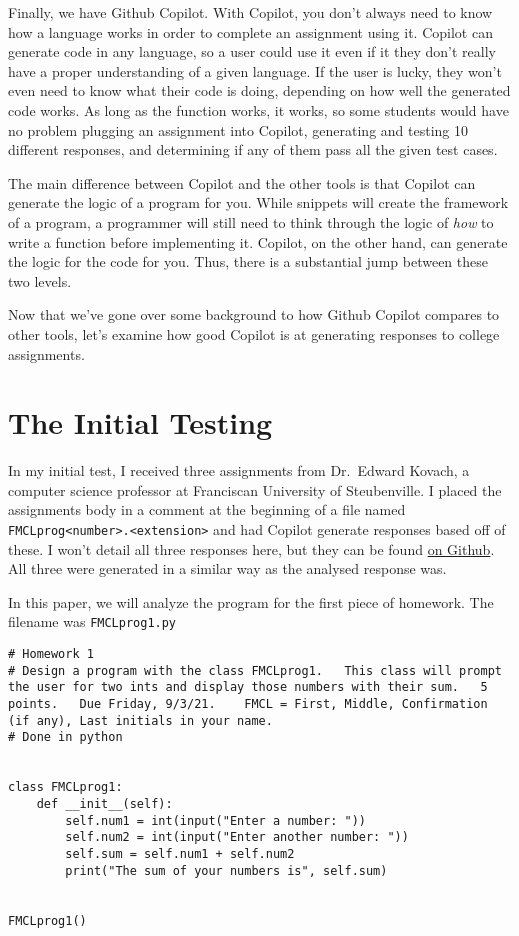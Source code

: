 \documentclass[12pt]{article}
\begin{document}
Finally, we have Github Copilot. With Copilot, you don't always need to
know how a language works in order to complete an assignment using it.
Copilot can generate code in any language, so a user could use it even
if it they don't really have a proper understanding of a given language.
If the user is lucky, they won't even need to know what their code is
doing, depending on how well the generated code works. As long as the
function works, it works, so some students would have no problem
plugging an assignment into Copilot, generating and testing 10 different
responses, and determining if any of them pass all the given test cases.

The main difference between Copilot and the other tools is that Copilot
can generate the logic of a program for you. While snippets will create
the framework of a program, a programmer will still need to think
through the logic of \emph{how} to write a function before implementing
it. Copilot, on the other hand, can generate the logic for the code for
you. Thus, there is a substantial jump between these two levels.

Now that we've gone over some background to how Github Copilot compares
to other tools, let's examine how good Copilot is at generating
responses to college assignments.

\hypertarget{the-initial-testing}{%
\section{The Initial Testing}\label{the-initial-testing}}

In my initial test, I received three assignments from Dr.~Edward Kovach,
a computer science professor at Franciscan University of Steubenville. I
placed the assignments body in a comment at the beginning of a file
named
\texttt{FMCLprog\textless{}number\textgreater{}.\textless{}extension\textgreater{}}
and had Copilot generate responses based off of these. I won't detail
all three responses here, but they can be found
\href{https://github.com/2br-2b/Github-Copilot-Project/tree/master/Scholarly\%20Testing/}{on
Github}. All three were generated in a similar way as the analysed
response was.

In this paper, we will analyze the program for the first piece of
homework. The filename was \texttt{FMCLprog1.py}

\begin{lstlisting}
# Homework 1 
# Design a program with the class FMCLprog1.   This class will prompt the user for two ints and display those numbers with their sum.   5 points.   Due Friday, 9/3/21.    FMCL = First, Middle, Confirmation (if any), Last initials in your name. 
# Done in python 


class FMCLprog1:
    def __init__(self):
        self.num1 = int(input("Enter a number: "))
        self.num2 = int(input("Enter another number: "))
        self.sum = self.num1 + self.num2
        print("The sum of your numbers is", self.sum)


FMCLprog1()
\end{lstlisting}
\end{document}
